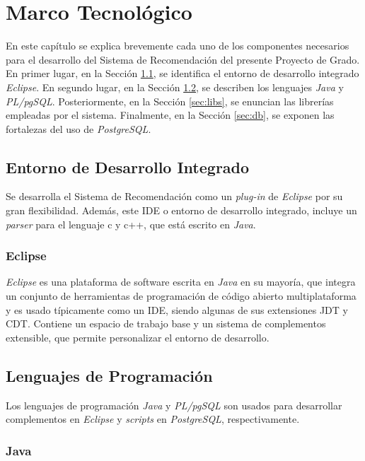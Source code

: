 \chapter{Marco Tecnológico}

En este capítulo se explica brevemente cada uno de los componentes necesarios
para el desarrollo del Sistema de Recomendación del presente Proyecto de Grado.
En primer lugar, en la Sección \ref{sec:ide}, se identifica el entorno de desarrollo integrado \textit{Eclipse}.
En segundo lugar, en la Sección \ref{sec:languajes}, se describen los lenguajes \textit{Java} y \textit{PL/pgSQL}.
Posteriormente, en la Sección \ref{sec:libs}, se enuncian las librerías empleadas por el sistema.
Finalmente, en la Sección \ref{sec:db}, se exponen las fortalezas del uso de \textit{PostgreSQL}.

\section{Entorno de Desarrollo Integrado}
\label{sec:ide}

Se desarrolla el Sistema de Recomendación como un \textit{plug-in}
de \textit{Eclipse} por su gran flexibilidad.
Además, este \ac{IDE} o entorno de desarrollo integrado,
incluye un \textit{parser} para el lenguaje c y c++,
que está escrito en \textit{Java}.

\subsection{Eclipse}
\textit{Eclipse} es una plataforma de software escrita en \textit{Java} en su mayoría,
que integra un conjunto de herramientas de programación de código abierto multiplataforma
y es usado típicamente como un \ac{IDE}, siendo algunas de sus extensiones \ac{JDT} y \ac{CDT}.
Contiene un espacio de trabajo base y un sistema de complementos extensible,
que permite personalizar el entorno de desarrollo.

\section{Lenguajes de Programación}
\label{sec:languajes}

Los lenguajes de programación \textit{Java} y \textit{PL/pgSQL}
son usados para desarrollar complementos en \textit{Eclipse} y
\textit{scripts} en \textit{PostgreSQL}, respectivamente.

\subsection{Java}

